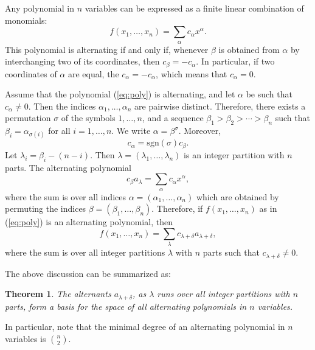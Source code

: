 \documentclass{amsart}
\theoremstyle{plain}
\newtheorem{theorem}{Theorem}[section]
\newcommand{\sgn}{\mathrm{sgn}}
\theoremstyle{definition}
\theoremstyle{remark}
\begin{document}
Any polynomial in $n$ variables can be expressed as a finite linear combination of monomials:
\begin{equation}
\label{eq:poly}
  f(x_1,\dotsc,x_n)=\sum_\alpha c_\alpha x^\alpha.
\end{equation}
This polynomial is alternating if and only if, whenever $\beta$ is obtained from $\alpha$ by interchanging two of its coordinates, then $c_\beta = -c_\alpha$.
In particular, if two coordinates of $\alpha$ are equal, the $c_\alpha = -c_\alpha$, which means that $c_\alpha=0$.

Assume that the polynomial (\ref{eq:poly}) is alternating, and let $\alpha$ be such that $c_\alpha\neq 0$. Then the indices $\alpha_1,\dotsc,\alpha_n$ are pairwise distinct.
Therefore, there exists a permutation $\sigma$ of the symbols $1,\dotsc,n$, and a sequence $\beta_1>\beta_2>\dotsb >\beta_n$ such that $\beta_i = \alpha_{\sigma(i)}$ for all $i=1,\dotsc,n$.
We write $\alpha = \beta^\sigma$.
Moreover,
\begin{displaymath}
  c_\alpha = \sgn(\sigma) c_\beta.
\end{displaymath}
Let $\lambda_i=\beta_i-(n-i)$.
Then $\lambda=(\lambda_1,\dotsc,\lambda_n)$ is an integer partition with $n$ parts.
The alternating polynomial
\begin{displaymath}
  c_\beta a_\lambda = \sum_\alpha c_\alpha x^\alpha,
\end{displaymath}
where the sum is over all indices $\alpha=(\alpha_1,\dotsc,\alpha_n)$ which are obtained by permuting the indices $\beta=(\beta_1,\dotsc,\beta_n)$.
Therefore, if $f(x_1,\dotsc,x_n)$ as in (\ref{eq:poly}) is an alternating polynomial, then
\begin{displaymath}
  f(x_1,\dotsc,x_n) = \sum_\lambda c_{\lambda+\delta} a_{\lambda+\delta},
\end{displaymath}
where the sum is over all integer partitions $\lambda$ with $n$ parts such that $c_{\lambda+\delta}\neq 0$.

The above discussion can be summarized as:
\begin{theorem}
  \label{theorem:alternant-basis}
  The alternants $a_{\lambda+\delta}$, as $\lambda$ runs over all integer partitions with $n$ parts, form a basis for the space of all alternating polynomials in $n$ variables.
\end{theorem}
In particular, note that the minimal degree of an alternating polynomial in $n$ variables is $\binom n2$.
\end{document}
